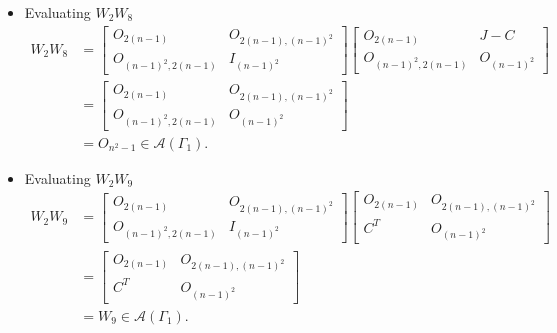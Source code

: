 \begin{itemize}
    \item Evaluating $W_2W_8$
    \begin{align*}
        W_2W_8
        &= \begin{bmatrix}
            O_{2(n-1)} & O_{2(n-1), (n-1)^2} \\
            O_{(n-1)^2, 2(n-1)} & I_{(n-1)^2}
        \end{bmatrix}\begin{bmatrix}
            O_{2(n-1)} & J-C \\
            O_{(n-1)^2, 2(n-1)} & O_{(n-1)^2}
        \end{bmatrix} \\
        &= \begin{bmatrix}
            O_{2(n-1)} & O_{2(n-1), (n-1)^2} \\
            O_{(n-1)^2, 2(n-1)} & O_{(n-1)^2}
        \end{bmatrix} \\
        &= O_{n^2-1}\in\mathcal{A}(\Gamma_1).
    \end{align*}
    
    \item Evaluating $W_2W_9$
    \begin{align*}
        W_2W_9
        &= \begin{bmatrix}
            O_{2(n-1)} & O_{2(n-1), (n-1)^2} \\
            O_{(n-1)^2, 2(n-1)} & I_{(n-1)^2}
        \end{bmatrix}\begin{bmatrix}
            O_{2(n-1)} & O_{2(n-1), (n-1)^2} \\
            C^T & O_{(n-1)^2}
        \end{bmatrix} \\
        &= \begin{bmatrix}
            O_{2(n-1)} & O_{2(n-1), (n-1)^2} \\
            C^T & O_{(n-1)^2}
        \end{bmatrix} \\
        &= W_9\in\mathcal{A}(\Gamma_1).
    \end{align*}
    

\end{itemize}
